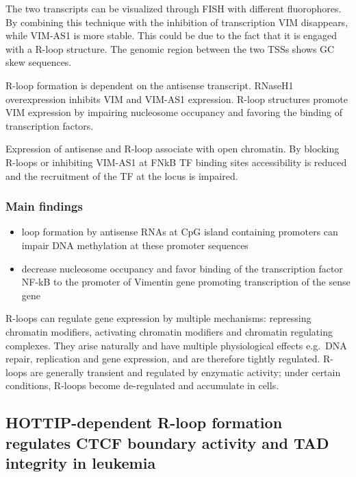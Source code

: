 The two transcripts can be visualized through FISH with different fluorophores. By combining this technique with the inhibition of transcription VIM disappears, while VIM-AS1 is more stable. This could be due to the fact that it is engaged with a R-loop structure. The genomic region between the two TSSs shows GC skew sequences.

R-loop formation is dependent on the antisense transcript. RNaseH1 overexpression inhibits VIM and VIM-AS1 expression. R-loop structures promote VIM expression by impairing nucleosome occupancy and favoring the binding of transcription factors.

Expression of antisense and R-loop associate with open chromatin. By blocking R-loops or inhibiting VIM-AS1 at FNkB TF binding sites accessibility is reduced and the recruitment of the TF at the locus is impaired.

\hypertarget{main-findings}{%
\subsubsection{Main findings}\label{main-findings}}
\begin{itemize}
\tightlist
\item
  loop formation by antisense RNAs at CpG island containing promoters can impair DNA methylation at these promoter sequences
\item
  decrease nucleosome occupancy and favor binding of the transcription factor NF-kB to the promoter of Vimentin gene promoting transcription of the sense gene
\end{itemize}

R-loops can regulate gene expression by multiple mechanisms: repressing chromatin modifiers, activating chromatin modifiers and chromatin regulating complexes. They arise naturally and have multiple physiological effects e.g.~DNA repair, replication and gene expression, and are therefore tightly regulated. R-loops are generally transient and regulated by enzymatic activity; under certain conditions, R-loops become de-regulated and accumulate in cells.

\hypertarget{hottip-dependent-r-loop-formation-regulates-ctcf-boundary-activity-and-tad-integrity-in-leukemia}{%
\subsection{HOTTIP-dependent R-loop formation regulates CTCF boundary activity and TAD integrity in leukemia}\label{hottip-dependent-r-loop-formation-regulates-ctcf-boundary-activity-and-tad-integrity-in-leukemia}}

